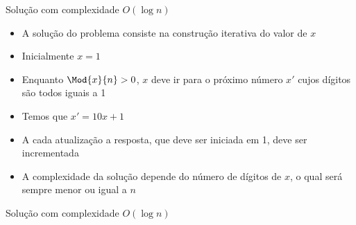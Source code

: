 \begin{frame}[fragile]{Solução com complexidade $O(\log n)$}

    \begin{itemize}
        \item A solução do problema consiste na construção iterativa do valor de $x$

        \item Inicialmente $x = 1$

        \item Enquanto $\Mod{x}{n} > 0$, $x$ deve ir para o próximo número $x'$ cujos dígitos são
            todos iguais a 1

        \item Temos que $x' = 10x + 1$

        \item A cada atualização a resposta, que deve ser iniciada em 1, deve ser incrementada

        \item A complexidade da solução depende do número de dígitos de $x$, o qual será sempre
            menor ou igual a $n$

    \end{itemize}

\end{frame}

\begin{frame}[fragile]{Solução com complexidade $O(\log n)$}
\end{frame}
